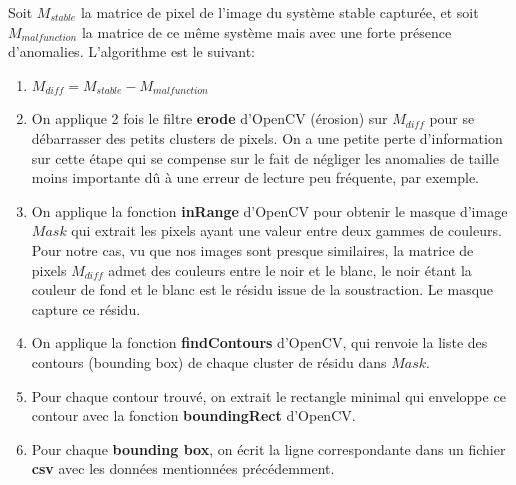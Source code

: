 \documentclass[french]{article}
\theoremstyle{mytheoremstyle}
\theoremstyle{mytheoremstyle}
\theoremstyle{myproblemstyle}
\begin{document}
        \newline
        Soit $M_{stable}$ la matrice de pixel de l'image du système stable capturée, et soit $M_{malfunction}$ la matrice de ce même système mais avec une forte présence d'anomalies.
        L'algorithme est le suivant:
        \begin{enumerate}
            \item $M_{diff} = M_{stable} - M_{malfunction}$
            \item On applique 2 fois le filtre \textbf{erode} d'OpenCV (érosion) sur $M_{diff}$ pour se débarrasser des petits clusters de pixels. On a une petite perte d'information sur cette étape qui se compense sur le fait de négliger les anomalies de taille moins importante dû à une erreur de lecture peu fréquente, par exemple.
            \item On applique la fonction \textbf{inRange} d'OpenCV pour obtenir le masque d'image $Mask$ qui extrait les pixels ayant une valeur entre deux gammes de couleurs. Pour notre cas, vu que nos images sont presque similaires, la matrice de pixels $M_{diff}$ admet des couleurs entre le noir et le blanc, le noir étant la couleur de fond et le blanc est le résidu issue de la soustraction. Le masque capture ce résidu.
            \item On applique la fonction \textbf{findContours} d'OpenCV, qui renvoie la liste des contours (bounding box) de chaque cluster de résidu dans $Mask$.
            \item Pour chaque contour trouvé, on extrait le rectangle minimal qui enveloppe ce contour avec la fonction \textbf{boundingRect} d'OpenCV.
            \item Pour chaque \textbf{bounding box}, on écrit la ligne correspondante dans un fichier \textbf{csv} avec les données mentionnées précédemment.
        \end{enumerate}
\end{document}
